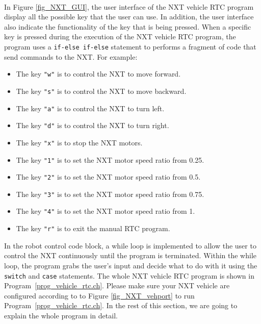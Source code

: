 \documentclass[11pt]{article}
\begin{document}
\\
In Figure \ref{fig_NXT_GUI}, the user interface of the NXT vehicle RTC program display all the 
possible key that the user can use. In addition, the user interface also indicate the functionality 
of the key that is being pressed. When a specific key is pressed during the execution of the NXT 
vehicle RTC program, the program uses a \verb+if-else if-else+ statement to performs a fragment of code that
send commands to the NXT.
For example:\\
\begin{itemize}
\item The key \verb+"w"+ is to control the NXT to move forward.
\item The key \verb+"s"+ is to control the NXT to move backward.
\item The key \verb+"a"+ is to control the NXT to turn left.
\item The key \verb+"d"+ is to control the NXT to turn right.
\item The key \verb+"x"+ is to stop the NXT motors.
\item The key \verb+"1"+ is to set the NXT motor speed ratio from 0.25.
\item The key \verb+"2"+ is to set the NXT motor speed ratio from 0.5.
\item The key \verb+"3"+ is to set the NXT motor speed ratio from 0.75.
\item The key \verb+"4"+ is to set the NXT motor speed ratio from 1.
\item The key \verb+"r"+ is to exit the manual RTC program.
\end{itemize}

\noindent
In the robot control code block, a while loop is implemented to allow the user to control the NXT
continuously until the program is terminated. Within the while loop, the program grabs the user's 
input and decide what to do with it using the \verb+switch+ and \verb+case+ statements. The whole 
NXT vehicle RTC program is shown in Program~\ref{prog_vehicle_rtc.ch}. Please make sure your NXT 
vehicle are configured according to to Figure \ref{fig_NXT_vehport} to run 
Program~\ref{prog_vehicle_rtc.ch}. In the rest of this section, we are going to explain the whole 
program in detail.

\end{document}

